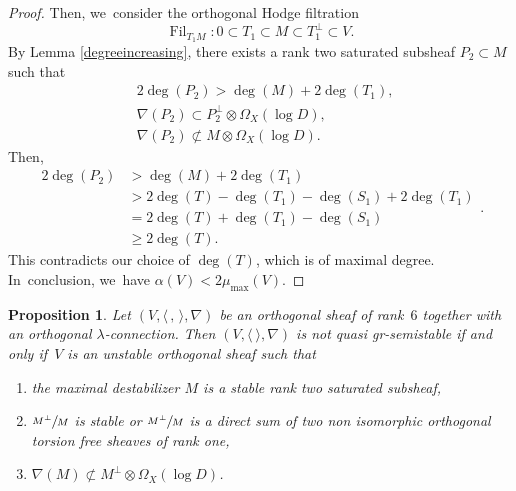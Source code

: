 \documentclass[JEP,XML,SOM,Unicode,published]{cedram}
\newcommand{\lconnection}{$\lambda$\nobreakdash-con\-nec\-tion\xspace}
\newcommand{\grsemistable}{gr\nobreakdash-semi\-stable\xspace}
\DeclareMathOperator{\Filt}{Fil}
\theoremstyle{plain}
\newtheorem{prop}[thm]{Proposition}
\theoremstyle{definition}
\begin{document}
\begin{proof}
Then, we~consider the orthogonal Hodge filtration
\[
\Filt_{T_1M}:0\subset T_1\subset M\subset T_1^\perp \subset V.
\]
By Lemma \ref{degreeincreasing}, there exists a rank two saturated subsheaf $P_2 \subset M$ such that
\begin{align*}
& 2\deg(P_2)>\deg(M)+2\deg(T_1), \\
& \nabla(P_2)\subset P_2^\perp\otimes\Omega_X(\log D), \\
& \nabla(P_2)\not\subset M\otimes\Omega_X(\log D).
\end{align*}
Then,
\begin{equation*}
\begin{split}
2\deg(P_2)&>\deg(M)+2\deg(T_1)\\
&>2\deg(T)-\deg(T_1)-\deg(S_1)+2\deg(T_1)\\
&=2\deg(T)+\deg(T_1)-\deg(S_1)\\
&\geq 2\deg(T).
\end{split}.
\end{equation*}
This contradicts our choice of $\deg(T)$, which is of maximal degree. In~conclusion, we~have $\alpha(V)<2\mu_{\max}(V)$.
\end{proof}


\begin{prop}\label{classfication6}
Let $(V,\langle \,, \, \rangle,\nabla)$ be an orthogonal sheaf of rank~$6$ together with an orthogonal \lconnection. Then $(V,\langle \ \rangle,\nabla)$ is not quasi \grsemistable if and only if~$V$ is an unstable orthogonal sheaf such that
\begin{enumerate}
\item the maximal destabilizer $M$ is a stable rank two saturated subsheaf,
\item $\sfrac{M^\perp}{M}$ is stable or $\sfrac{M^\perp}{M}$ is a direct sum of two non isomorphic orthogonal torsion free sheaves of rank one,
\item $\nabla(M)\not\subset M^\perp\otimes\Omega_X(\log D)$.
\end{enumerate}
\end{prop}
\end{document}
